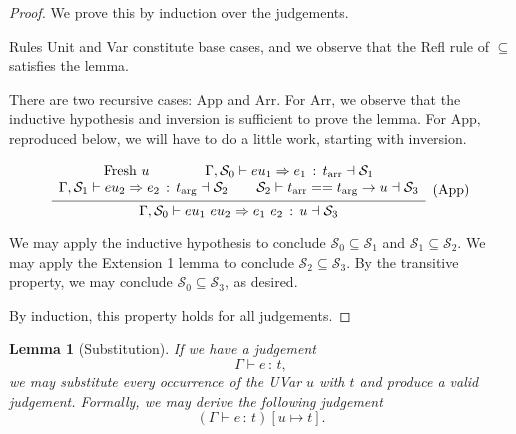 \documentclass{article}
\newtheorem{lemma}{Lemma}
\newcommand{\G}{\Gamma}
\newcommand{\St}{\mathcal{S}}
\newcommand{\tp}{t}
\newcommand{\tarr}{t_{\text{arr}}}
\newcommand{\targ}{t_{\text{arg}}}
\newcommand{\uv}{u}
\newcommand{\eu}{eu}
\newcommand{\e}{e}
\newcommand{\spc}{\qquad}
\newcommand{\eq}{==}
\renewcommand{\implies}{\Rightarrow}
\newcommand{\fresh}{\text{Fresh}\ }
\newcommand{\withtp}[2]{{#1} \,:\, {#2}}
\newcommand{\app}[2]{{#1}\ {#2}}
\newcommand{\arr}[2]{{#1} \to {#2}}
\newcommand{\hastp}[3]{#1 \vdash {\withtp {#2} {#3}}}
\newcommand{\algtp}[6]{#1, #2 \vdash #3 \implies {\withtp {#4} {#5}} \dashv #6}
\newcommand{\equals}[4]{{#1} \vdash {#2} \eq {#3} \dashv {#4}}
\newcommand{\deduct}[3][]
{
  \begin{prooftree}
    \hypo{#2}
    \infer1[\text{#1}]{#3}
  \end{prooftree}
}
\begin{document}
\begin{proof}
  We prove this by induction over the judgements.

  Rules Unit and Var constitute base cases, and we observe that the Refl rule of
  \(\subseteq\) satisfies the lemma.

  There are two recursive cases: App and Arr. For Arr, we observe that the
  inductive hypothesis and inversion is sufficient to prove the lemma. For App,
  reproduced below, we will have to do a little work, starting with inversion.

  \[
    \deduct
    {\begin{array}{c}
      \fresh \uv \spc \spc
     \algtp \G {\St_0} {\eu_1} {\e_1} \tarr {\St_1} \\
     \algtp \G {\St_1} {\eu_2} {\e_2} \targ {\St_2} \spc
     \equals {\St_2} {\tarr} {\arr {\targ} \uv} {\St_3}
     \end{array}
    }
    {\algtp \G {\St_0} {\app {\eu_1} {\eu_2}} {\app {\e_1} {\e_2}} {\uv} {\St_3}}
    {\text{(App)}}
  \]

  We may apply the inductive hypothesis to conclude \(\St_0 \subseteq \St_1\)
  and \(\St_1 \subseteq \St_2\). We may apply the Extension 1 lemma to conclude
  \(\St_2 \subseteq \St_3\). By the transitive property, we may conclude \(\St_0
  \subseteq \St_3\), as desired.

  By induction, this property holds for all judgements.
\end{proof}

\begin{lemma}[Substitution]
  If we have a judgement
  \[\hastp \G \e \tp, \]
  we may substitute every occurrence of the UVar \(\uv\) with \(\tp\) and produce a valid
  judgement. Formally, we may derive the following judgement
  \[\left( \hastp \G \e \tp \right)[\uv \mapsto \tp].\]
\end{lemma}
\end{document}
